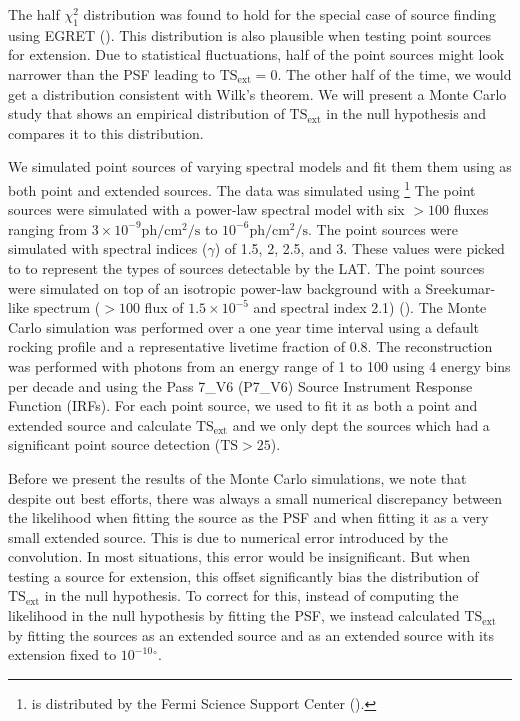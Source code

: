 \documentclass[12pt,preprint]{aastex}
\newcommand{\mev}{\text{MeV}\xspace}
\newcommand{\gev}{\text{GeV}\xspace}
\newcommand{\ph}{\text{ph}\xspace}
\newcommand{\cm}{\text{cm}\xspace}
\renewcommand{\sec}{\text{s}\xspace}
\newcommand{\tsext}{{\ensuremath{\text{TS}_\text{ext}}}\xspace}
\newcommand{\ts}{\text{TS}\xspace}
\renewcommand{\deg}{\ensuremath{^\circ}\xspace}
\newcommand{\pointlike}{\text{\em pointlike}\xspace}
\newcommand{\gtobssim}{\text{\em gtobssim}\xspace}
\begin{document}
The half $\chi^2_1$ distribution was found to hold for the special case
of source finding using EGRET (\cite{mattox_egret}). This distribution
is also plausible when testing point sources for extension. Due to
statistical fluctuations, half of the point sources might look narrower
than the PSF leading to $\tsext=0$. The other half of the time, we would
get a distribution consistent with Wilk's theorem. We will present a
Monte Carlo study that shows an empirical distribution of \tsext in the
null hypothesis and compares it to this distribution.

We simulated point sources of varying spectral models and fit them
them using \pointlike as both point and extended sources. The data was
simulated using \gtobssim\footnote{\gtobssim is distributed
by the Fermi Science Support Center (\cite{fssc}).}
The point sources were simulated with a power-law spectral model with
six $>100$ \mev fluxes ranging from $3\times 10^{-9} \ph/\cm^2/\sec$ to
$10^{-6} \ph/\cm^2/\sec$.  The point sources were simulated with spectral
indices ($\gamma$) of 1.5, 2, 2.5, and 3.  These values were picked to
to represent the types of sources detectable by the LAT.  The point
sources were simulated on top of an isotropic power-law background
with a Sreekumar-like spectrum ($>100$ \mev flux of $1.5\times 10^{-5}$ and spectral
index 2.1) (\cite{sreekumar_isotropic}).  The Monte Carlo simulation was
performed over a one year time interval using a default rocking profile
and a representative livetime fraction of 0.8.  The reconstruction was
performed with photons from an energy range of 1 \gev to 100 \gev using 4
energy bins per decade and using the 
Pass 7\_V6 (P7\_V6) Source Instrument
Response Function (IRFs).  For each point source, we used \pointlike
to fit it as both a point and extended source and calculate \tsext and
we only dept the sources which had a significant point source detection
($\ts>25$).

Before we present the results of the Monte Carlo simulations, we note
that despite out best efforts, there was always a small numerical
discrepancy between the likelihood when fitting the source as the PSF
and when fitting it as a very small extended source. This is due to
numerical error introduced by the convolution.  In most situations, this
error would be insignificant. But when testing a source for extension,
this offset significantly bias the distribution of \tsext in the null
hypothesis. To correct for this, instead of computing the likelihood in
the null hypothesis by fitting the PSF, we instead calculated \tsext by
fitting the sources as an extended source and as an extended source with
its extension fixed to ${10^{-10}}\deg$.
\end{document}
